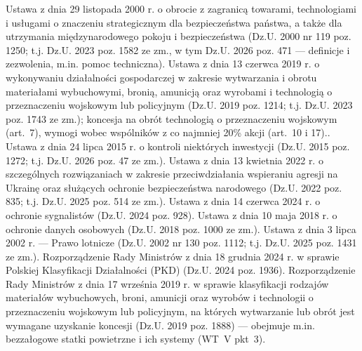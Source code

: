\begin{BibList}
 Ustawa z dnia 29 listopada 2000 r. o obrocie z zagranicą towarami, technologiami i usługami o znaczeniu strategicznym dla bezpieczeństwa państwa, a także dla utrzymania międzynarodowego pokoju i bezpieczeństwa (Dz.U. 2000 nr 119 poz. 1250; t.j. Dz.U. 2023 poz. 1582 ze zm., w tym Dz.U. 2026 poz. 471 --- definicje i zezwolenia, m.in. pomoc techniczna).
 Ustawa z dnia 13 czerwca 2019 r. o wykonywaniu działalności gospodarczej w zakresie wytwarzania i obrotu materiałami wybuchowymi, bronią, amunicją oraz wyrobami i technologią o przeznaczeniu wojskowym lub policyjnym (Dz.U. 2019 poz. 1214; t.j. Dz.U. 2023 poz. 1743 ze zm.); koncesja na obrót technologią o przeznaczeniu wojskowym (art.~7), wymogi wobec wspólników z co najmniej 20\% akcji (art.~10 i 17)..
 Ustawa z dnia 24 lipca 2015 r. o kontroli niektórych inwestycji (Dz.U. 2015 poz. 1272; t.j. Dz.U. 2026 poz. 47 ze zm.).
 Ustawa z dnia 13 kwietnia 2022 r. o szczególnych rozwiązaniach w zakresie przeciwdziałania wspieraniu agresji na Ukrainę oraz służących ochronie bezpieczeństwa narodowego (Dz.U. 2022 poz. 835; t.j. Dz.U. 2025 poz. 514 ze zm.).
 Ustawa z dnia 14 czerwca 2024 r. o ochronie sygnalistów (Dz.U. 2024 poz. 928).
 Ustawa z dnia 10 maja 2018 r. o ochronie danych osobowych (Dz.U. 2018 poz. 1000 ze zm.).
 Ustawa z dnia 3 lipca 2002 r. --- Prawo lotnicze (Dz.U. 2002 nr 130 poz. 1112; t.j. Dz.U. 2025 poz. 1431 ze zm.).
 Rozporządzenie Rady Ministrów z dnia 18 grudnia 2024 r. w sprawie Polskiej Klasyfikacji Działalności (PKD) (Dz.U. 2024 poz. 1936).
 Rozporządzenie Rady Ministrów z dnia 17 września 2019 r. w sprawie klasyfikacji rodzajów materiałów wybuchowych, broni, amunicji oraz wyrobów i technologii o przeznaczeniu wojskowym lub policyjnym, na których wytwarzanie lub obrót jest wymagane uzyskanie koncesji (Dz.U. 2019 poz. 1888) --- obejmuje m.in. bezzałogowe statki powietrzne i ich systemy (WT~V pkt~3).
\end{BibList}

